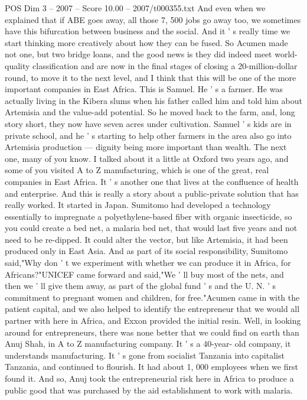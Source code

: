 \begin{textsample}{POS Dim 3 – 2007 – Score 10.00 – 2007/t000355.txt}
And even when we explained that if ABE goes away, all those 7, 500 jobs go away too, we sometimes have this bifurcation between business and the social.
And it ' s really time we start thinking more creatively about how they can be fused.
So Acumen made not one, but two bridge loans, and the good news is they did indeed meet world-quality classification and are now in the final stages of closing a 20-million-dollar round, to move it to the next level, and I think that this will be one of the more important companies in East Africa.
This is Samuel.
He ' s a farmer.
He was actually living in the Kibera slums when his father called him and told him about Artemisia and the value-add potential.
So he moved back to the farm, and, long story short, they now have seven acres under cultivation.
Samuel ' s kids are in private school, and he ' s starting to help other farmers in the area also go into Artemisia production — dignity being more important than wealth.
The next one, many of you know.
I talked about it a little at Oxford two years ago, and some of you visited A to Z manufacturing, which is one of the great, real companies in East Africa.
It ' s another one that lives at the confluence of health and enterprise.
And this is really a story about a public-private solution that has really worked.
It started in Japan.
Sumitomo had developed a technology essentially to impregnate a polyethylene-based fiber with organic insecticide, so you could create a bed net, a malaria bed net, that would last five years and not need to be re-dipped.
It could alter the vector, but like Artemisia, it had been produced only in East Asia.
And as part of its social responsibility, Sumitomo said,"Why don ' t we experiment with whether we can produce it in Africa, for Africans?"UNICEF came forward and said,"We ' ll buy most of the nets, and then we ' ll give them away, as part of the global fund ' s and the U.
N. ' s commitment to pregnant women and children, for free."Acumen came in with the patient capital, and we also helped to identify the entrepreneur that we would all partner with here in Africa, and Exxon provided the initial resin.
Well, in looking around for entrepreneurs, there was none better that we could find on earth than Anuj Shah, in A to Z manufacturing company.
It ' s a 40-year- old company, it understands manufacturing.
It ' s gone from socialist Tanzania into capitalist Tanzania, and continued to flourish.
It had about 1, 000 employees when we first found it.
And so, Anuj took the entrepreneurial risk here in Africa to produce a public good that was purchased by the aid establishment to work with malaria.

\end{textsample}
